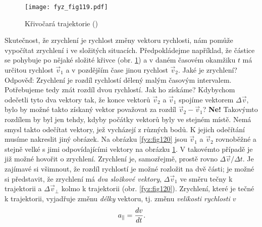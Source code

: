     \begin{figure}[ht!]  %
      \centering
      \texttt{[image: fyz\_fig119.pdf]}
      \caption{Křivočará trajektorie
              (\cite[s.~163]{Feynman01})}
      \label{fyz:fig119}
    \end{figure}
    Skutečnost, že zrychlení je rychlost změny vektoru rychlosti, nám pomůže vypočítat zrychlení i 
    ve složitých situacích. Předpokládejme například, že částice se pohybuje po nějaké složité 
    křivce (obr. \ref{fyz:fig119}) a v daném časovém okamžiku \(t\) má určitou rychlost 
    \(\vec{v}_1\) a v pozdějším čase jinou rychlost \(\vec{v}_2\). Jaké je zrychlení? Odpověď: 
    Zrychlení je rozdíl rychlostí dělený malým časovým intervalem. Potřebujeme tedy znát rozdíl 
    dvou rychlostí. Jak ho získáme? Kdybychom odečetli tyto dva vektory tak, že konce vektorů 
    \(\vec{v}_2\) a \(\vec{v}_1\) spojíme vektorem \(\Delta \vec{v}\), bylo by možné takto získaný 
    vektor považovat za rozdíl \(\vec{v}_2 - \vec{v}_1\)? \textbf{Ne!} Takovýmto rozdílem by byl 
    jen tehdy, kdyby počátky vektorů byly ve stejném místě. Nemá smysl takto odečítat vektory, jež 
    vycházejí z různých bodů. K jejich odečítání musíme nakreslit jiný obrázek. Na obrázku 
    \ref{fyz:fig120} jsou \(\vec{v}_1\) a \(\vec{v}_2\) rovnoběžné a stejně velké s jimi 
    odpovídajícími vektory na obrázku \ref{fyz:fig119}. V takovémto případě je již možné hovořit o 
    zrychlení. Zrychlení je, samozřejmě, prostě rovno \(\Delta\vec{v}/\Delta t\). Je zajímavé si 
    všimnout, že rozdíl rychlostí je možné rozložit na dvě části; je možné si představit, že 
    zrychlení má \emph{dva složkové vektory}, \(\Delta\vec{v}_1\) ve směru tečny k trajektorii a 
    \(\Delta\vec{v}_\perp\) kolmo k trajektorii (obr. \ref{fyz:fig120}). Zrychlení, které je tečné 
    k trajektorii, vyjadřuje změnu \emph{délky} vektoru, tj. změnu \emph{velikosti rychlosti \(v\)}
    \begin{equation}\label{FYZ:eq153}
      a_\parallel = \dfrac{d v}{d t}.
    \end{equation}

